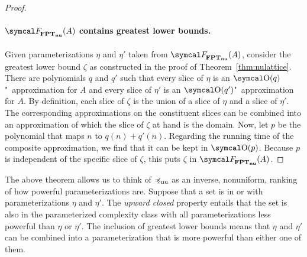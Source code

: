 \begin{proof}
  \paragraph{$\calF_\clnu{FPT}(A)$ contains greatest lower bounds.}
  Given parameterizations $\eta$ and $\eta'$ taken from $\calF_\clnu{FPT}(A)$, consider the greatest lower bound $\zeta$ as constructed in the proof of Theorem~\ref{thm:nulattice}.
  There are polynomials $q$ and $q'$ such that every slice of $\eta$ is an $\bigO(q)$"~approximation for $A$ and every slice of $\eta'$ is an $\bigO(q')$"~approximation for $A$.
  By definition, each slice of $\zeta$ is the union of a slice of $\eta$ and a slice of $\eta'$.
  The corresponding approximations on the constituent slices can be combined into an approximation of which the slice of $\zeta$ at hand is the domain.
  Now, let $p$ be the polynomial that maps $n$ to $q(n) + q'(n)$.
  Regarding the running time of the composite approximation, we find that it can be kept in $\bigO(p)$.
  Because $p$ is independent of the specific slice of $\zeta$, this puts $\zeta$ in $\calF_\clnu{FPT}(A)$.
\end{proof}

The above theorem allows us to think of $\preccurlyeq_\mathrm{nu}$ as an inverse, nonuniform, ranking of how powerful parameterizations are.
Suppose that a set is in  or  with parameterizations $\eta$ and $\eta'$.
The \emph{upward closed} property entails that the set is also in the parameterized complexity class with all parameterizations less powerful than $\eta$ or $\eta'$.
The inclusion of greatest lower bounds means that $\eta$ and $\eta'$ can be combined into a parameterization that is more powerful than either one of them.

